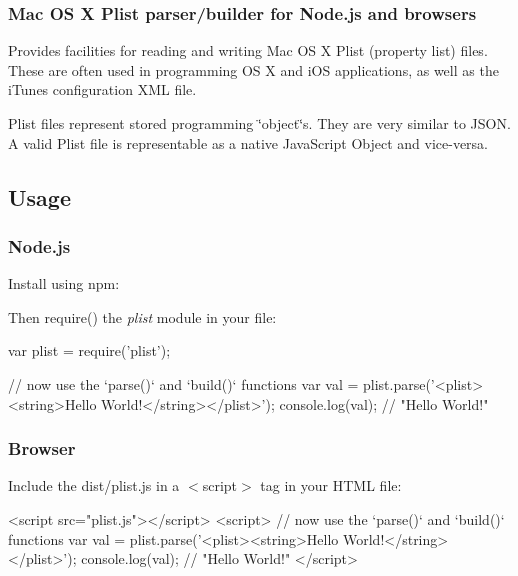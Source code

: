 \subsubsection*{Mac OS X Plist parser/builder for Node.\+js and browsers}

\href{https://saucelabs.com/u/plistjs}{\tt }

\href{https://travis-ci.org/TooTallNate/plist.js}{\tt }

Provides facilities for reading and writing Mac OS X Plist (property list) files. These are often used in programming OS X and i\+OS applications, as well as the i\+Tunes configuration X\+ML file.

Plist files represent stored programming \char`\"{}object\char`\"{}s. They are very similar to J\+S\+ON. A valid Plist file is representable as a native Java\+Script Object and vice-\/versa.

\subsection*{Usage}

\subsubsection*{Node.\+js}

Install using {\ttfamily npm}\+:




Then {\ttfamily require()} the {\itshape plist} module in your file\+:


\begin{DoxyCode}
var plist = require('plist');

// now use the `parse()` and `build()` functions
var val = plist.parse('<plist><string>Hello World!</string></plist>');
console.log(val);  // "Hello World!"
\end{DoxyCode}


\subsubsection*{Browser}

Include the {\ttfamily dist/plist.\+js} in a {\ttfamily $<$script$>$} tag in your H\+T\+ML file\+:


\begin{DoxyCode}
<script src="plist.js"></script>
<script>
  // now use the `parse()` and `build()` functions
  var val = plist.parse('<plist><string>Hello World!</string></plist>');
  console.log(val);  // "Hello World!"
</script>
\end{DoxyCode}


